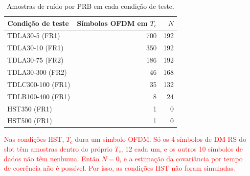 \begin{table}[htbp]
\color{red}
\caption{Amostras de ruído por PRB em cada condição de teste.}
\label{tab:n-condicao}
\centering
\footnotesize
\renewcommand{\arraystretch}{1.2}
\begin{tabular}{|l|r|r|}
\hline
Condição de teste & Símbolos OFDM em $T_c$ & $N$ \\
\hline
TDLA30-5 (FR1)    & 700 & 192 \\
TDLA30-10 (FR1)   & 350 & 192 \\
TDLA30-75 (FR2)   & 186 & 192 \\
TDLA30-300 (FR2)  & 46  & 168 \\
TDLC300-100 (FR1) & 35  & 132 \\
TDLB100-400 (FR1) & 8   & 24  \\
HST350 (FR1)      & 1   & 0   \\
HST500 (FR1)      & 1   & 0   \\
\hline
\end{tabular}
\end{table}

\textcolor{red}{Nas condições HST, $T_c$ dura um símbolo OFDM. Só os 4 símbolos de DM-RS do slot têm amostras dentro do próprio $T_c$, 12 cada um, e os outros 10 símbolos de dados não têm nenhuma. Então $N = 0$, e a estimação da covariância por tempo de coerência não é possível. Por isso, as condições HST não foram simuladas.}

